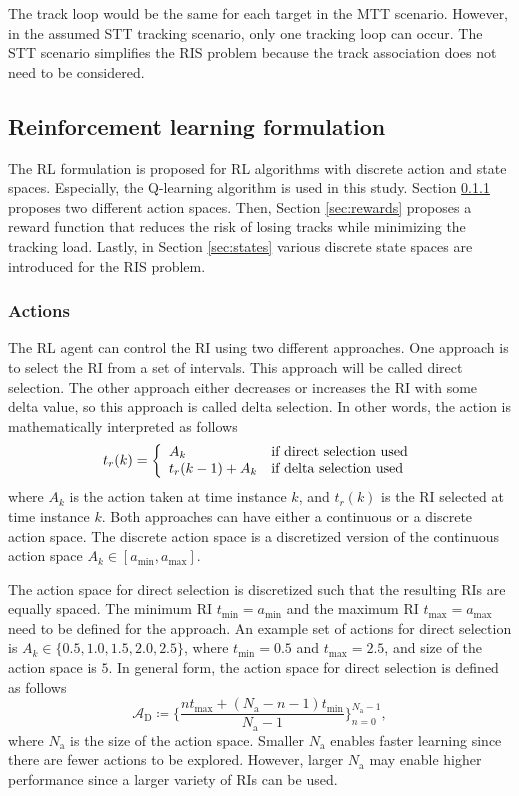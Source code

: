 \documentclass[english, 12pt, a4paper, elec, utf8, a-1b, online]{aaltothesis}
\numberwithin{equation}{section}
\newcommand{\amax}{a_\text{max}}
\newcommand{\amin}{a_\text{min}}
\newcommand{\As}{\mathcal{A}}
\newcommand{\tmax}{t_\text{max}}
\newcommand{\tmin}{t_\text{min}}
\newcommand{\Asdir}{\As_\text{D}}
\newcommand{\nacts}{{N_\text{a}}}
\newcommand{\ri}{t_r}
\begin{document}
The track loop would be the same for each target in the MTT scenario. 
However, in the assumed STT tracking scenario, only one tracking loop can occur. 
The STT scenario simplifies the RIS problem because the track association does not need to be considered.


\subsection{Reinforcement learning formulation}\label{sec:RL_formulation}

The RL formulation is proposed for RL algorithms with discrete action and state spaces. 
Especially, the Q-learning algorithm is used in this study. 
Section \ref{sec:actions} proposes two different action spaces.
Then, Section \ref{sec:rewards} proposes a reward function that reduces the risk of losing tracks while minimizing the tracking load. 
Lastly, in Section \ref{sec:states} various discrete state spaces are introduced for the RIS problem.

\subsubsection{Actions} \label{sec:actions}

The RL agent can control the RI using two different approaches.
One approach is to select the RI from a set of intervals.
This approach will be called direct selection.
The other approach either decreases or increases the RI with some delta value, so this approach is called delta selection.
In other words, the action is mathematically interpreted as follows
\begin{equation}
    \ri(k) = \left\{
        \begin{array}{l l}
            A_k & \text{if direct selection used} \\
            \ri(k-1) + A_k &  \text{if delta selection used}
        \end{array}\right.
\end{equation}
where $A_k$ is the action taken at time instance $k$, and $\ri(k)$ is the RI selected at time instance $k$.
Both approaches can have either a continuous or a discrete action space.
The discrete action space is a discretized version of the continuous action space $A_k \in [\amin, \amax]$.

The action space for direct selection is discretized such that the resulting RIs are equally spaced.
The minimum RI $\tmin=\amin$ and the maximum RI $\tmax=\amax$ need to be defined for the approach. 
An example set of actions for direct selection is $A_k \in \{0.5, 1.0, 1.5, 2.0, 2.5\}$, where $\tmin=0.5$ and $\tmax=2.5$, and size of the action space is $5$.
In general form, the action space for direct selection is defined as follows
\begin{equation}\label{eq:as_direct}
    \Asdir \coloneqq \{ \frac{n \tmax + (\nacts-n-1) \tmin}{\nacts-1} \}_{n=0}^{\nacts-1},    
\end{equation}
where $\nacts$ is the size of the action space.
Smaller $\nacts$ enables faster learning since there are fewer actions to be explored.
However, larger $\nacts$ may enable higher performance since a larger variety of RIs can be used.
\end{document}
